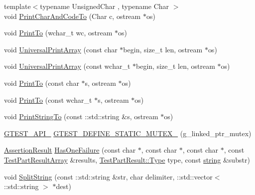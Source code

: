 \begin{DoxyCompactItemize}
\item 
{\footnotesize template$<$typename Unsigned\+Char , typename Char $>$ }\\void \hyperlink{namespacetesting_1_1internal_a0c577e598e61d339ba45dd6643fb1969}{Print\+Char\+And\+Code\+To} (Char c, ostream $\ast$os)
\item 
void \hyperlink{namespacetesting_1_1internal_aa74ea9d64f76ce69eceb225ca5ebef58}{Print\+To} (wchar\+\_\+t wc, ostream $\ast$os)
\item 
void \hyperlink{namespacetesting_1_1internal_a070107e7a8205ad6ec4d538d52b15b38}{Universal\+Print\+Array} (const char $\ast$begin, size\+\_\+t len, ostream $\ast$os)
\item 
void \hyperlink{namespacetesting_1_1internal_a52394019018eb5079f9f1bcca23dcd60}{Universal\+Print\+Array} (const wchar\+\_\+t $\ast$begin, size\+\_\+t len, ostream $\ast$os)
\item 
void \hyperlink{namespacetesting_1_1internal_adc6c98306d40b53fd07be4e295102a0a}{Print\+To} (const char $\ast$s, ostream $\ast$os)
\item 
void \hyperlink{namespacetesting_1_1internal_afc20fb56b2547a8f91f9ff99650f2024}{Print\+To} (const wchar\+\_\+t $\ast$s, ostream $\ast$os)
\item 
void \hyperlink{namespacetesting_1_1internal_ad609167d8d6792b0fb186539e0e159bd}{Print\+String\+To} (const \+::std\+::string \&s, ostream $\ast$os)
\item 
\hyperlink{gtest-port_8h_aa73be6f0ba4a7456180a94904ce17790}{G\+T\+E\+S\+T\+\_\+\+A\+P\+I\+\_\+} \hyperlink{namespacetesting_1_1internal_aff419d76acc3727be48d195f927189c9}{G\+T\+E\+S\+T\+\_\+\+D\+E\+F\+I\+N\+E\+\_\+\+S\+T\+A\+T\+I\+C\+\_\+\+M\+U\+T\+E\+X\+\_\+} (g\+\_\+linked\+\_\+ptr\+\_\+mutex)
\item 
\hyperlink{classtesting_1_1_assertion_result}{Assertion\+Result} \hyperlink{namespacetesting_1_1internal_a14ff02e6d151f45e998657674e9af88a}{Has\+One\+Failure} (const char $\ast$, const char $\ast$, const char $\ast$, const \hyperlink{classtesting_1_1_test_part_result_array}{Test\+Part\+Result\+Array} \&results, \hyperlink{classtesting_1_1_test_part_result_a65ae656b33fdfdfffaf34858778a52d5}{Test\+Part\+Result\+::\+Type} type, const \hyperlink{namespacetesting_1_1internal_a8e8ff5b11e64078831112677156cb111}{string} \&substr)
\item 
void \hyperlink{namespacetesting_1_1internal_a8eb8eddf760375a490e007b20777ec56}{Split\+String} (const \+::std\+::string \&str, char delimiter, \+::std\+::vector$<$ \+::std\+::string $>$ $\ast$dest)

\end{DoxyCompactItemize}
